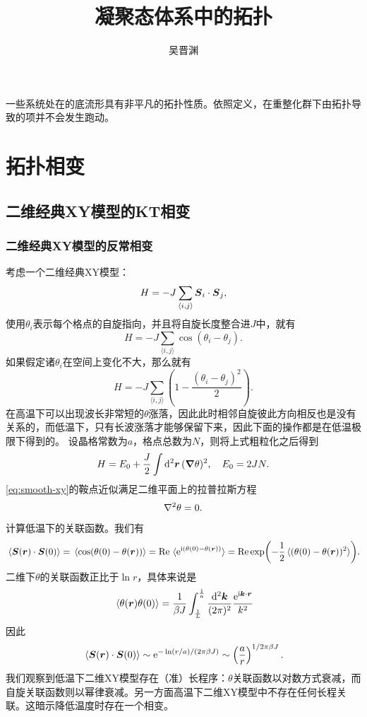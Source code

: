 \documentclass[hyperref, UTF8, a4paper]{ctexart}
\title{凝聚态体系中的拓扑}
\author{吴晋渊}
\newcommand*{\ii}{\mathrm{i}}
\newcommand*{\ee}{\mathrm{e}}
\newcommand*{\pair}[1]{\langle #1 \rangle}
\begin{document}
\maketitle

一些系统处在的底流形具有非平凡的拓扑性质。依照定义，在重整化群下由拓扑导致的项并不会发生跑动。%

\section{拓扑相变}

\subsection{二维经典XY模型的KT相变}

\subsubsection{二维经典XY模型的反常相变}

考虑一个二维经典XY模型：
\begin{equation}
    H = - J \sum_{\pair{i, j}} \vb*{S}_i \cdot \vb*{S}_j,
\end{equation}
使用$\theta_i$表示每个格点的自旋指向，并且将自旋长度整合进$J$中，就有
\begin{equation}
    H = - J \sum_{\pair{i, j}} \cos(\theta_i - \theta_j).
\end{equation}
如果假定诸$\theta_i$在空间上变化不大，那么就有
\[
    H = - J \sum_{\pair{i, j}} \left( 1 - \frac{(\theta_i - \theta_j)^2}{2} \right).
\]
在高温下可以出现波长非常短的$\theta$涨落，因此此时相邻自旋彼此方向相反也是没有关系的，而低温下，只有长波涨落才能够保留下来，因此下面的操作都是在低温极限下得到的。
设晶格常数为$a$，格点总数为$N$，则将上式粗粒化之后得到
\begin{equation}
    H = E_0 + \frac{J}{2} \int \dd[2]{\vb*{r}} (\grad{\theta})^2, \quad E_0 = 2 J N.
    \label{eq:smooth-xy}
\end{equation}
\eqref{eq:smooth-xy}的鞍点近似满足二维平面上的拉普拉斯方程
\begin{equation}
    \laplacian{\theta} = 0.
\end{equation}

计算低温下的关联函数。我们有
\[
    \expval*{\vb*{S}(\vb*{r}) \cdot \vb*{S}(0)} = \expval*{\cos(\theta(0) - \theta(\vb*{r}))} = \Re \expval*{\ee^{\ii (\theta(0) - \theta(\vb*{r}))}} = \Re \exp(-\frac{1}{2} \expval*{(\theta(0) - \theta(\vb*{r}))^2}).
\]
二维下$\theta$的关联函数正比于$\ln r$，具体来说是
\[
    \expval*{\theta(\vb*{r}) \theta(0)} = \frac{1}{\beta J} \int_{\frac{1}{L}}^{\frac{1}{a}} \frac{\dd[2]{\vb*{k}}}{(2\pi)^2} \frac{\ee^{\ii \vb*{k} \cdot \vb*{r}}}{k^2} 
\]
因此
\begin{equation}
    \expval*{\vb*{S}(\vb*{r}) \cdot \vb*{S}(0)} \sim \ee^{- \ln (r/a) / (2 \pi \beta J)} \sim \left(\frac{a}{r}\right)^{1/2\pi \beta J}.
\end{equation}
我们观察到低温下二维XY模型存在（准）长程序：$\theta$关联函数以对数方式衰减，而自旋关联函数则以幂律衰减。另一方面高温下二维XY模型中不存在任何长程关联。这暗示降低温度时存在一个相变。
\end{document}
